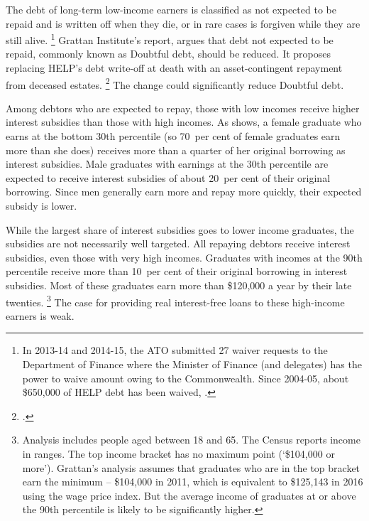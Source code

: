 \documentclass{grattan}
\begin{document}
The debt of long-term low-income earners is classified as not expected to be repaid and is written off when they die, or in rare cases is forgiven while they are still alive.%
   \footnote{In 2013-14 and 2014-15, the \gls{ATO} submitted 27 waiver requests to the Department of Finance where the Minister of Finance (and delegates) has the power to waive amount owing to the Commonwealth.
Since 2004-05, about \$650,000 of \gls{HELP} debt has been waived, \textcite[][38]{ANAO2016AdministrationHigherEducation}.} Grattan Institute's \citeyear{Norton2014Doubtfuldebtrising} report,  argues that debt not expected to be repaid, commonly known as \gls{Doubtful debt}, should be reduced.
It proposes replacing \gls{HELP}'s debt write-off at death with an asset-contingent repayment from deceased estates.%
\footcite{Norton2014Doubtfuldebtrising} 
The change could significantly reduce \gls{Doubtful debt}.

Among debtors who are expected to repay, those with low incomes receive higher interest subsidies than those with high incomes.
As  shows, a female graduate who earns at the bottom 30{th} percentile (so 70~per cent of female graduates earn more than she does) receives more than a quarter of her original borrowing as interest subsidies.
Male graduates with earnings at the 30{th} percentile are expected to receive interest subsidies of about 20~per cent of their original borrowing.
Since men generally earn more and repay more quickly, their expected subsidy is lower.

While the largest share of interest subsidies goes to lower income graduates, the subsidies are not necessarily well targeted.
All repaying debtors receive interest subsidies, even those with very high incomes.
Graduates with incomes at the 90{th} percentile receive more than 10~per cent of their original borrowing in interest subsidies.
Most of these graduates earn more than \$120,000 a year by their late twenties.%
   \footnote{Analysis includes people aged between 18 and 65.
The Census reports income in ranges.
The top income bracket has no maximum point (`\$104,000 or more').
Grattan's analysis assumes that graduates who are in the top bracket earn the minimum -- \$104,000 in 2011, which is equivalent to \$125,143 in 2016 using the wage price index.
But the average income of graduates at or above the 90{th} percentile is likely to be significantly higher.} The case for providing real interest-free loans to these high-income earners is weak.
\end{document}
